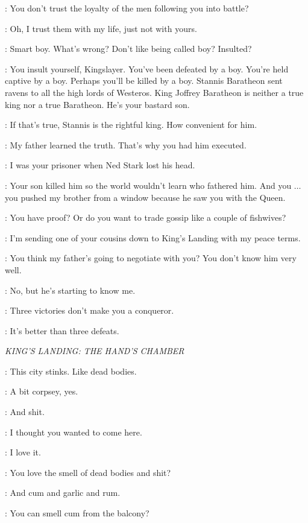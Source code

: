\JAIME: You don't trust the loyalty of the men following you into battle?

\ROBB: Oh, I trust them with my life, just not with yours.

\JAIME: Smart boy. What's wrong? Don't like being called boy? Insulted?

\ROBB: You insult yourself, Kingslayer. You've been defeated by a boy. You're held captive by a boy. Perhaps you'll be killed by a boy. Stannis Baratheon sent ravens to all the high lords of Westeros. King Joffrey Baratheon is neither a true king nor a true Baratheon. He's your bastard son.

\JAIME: If that's true, Stannis is the rightful king. How convenient for him.

\ROBB: My father learned the truth. That's why you had him executed.

\JAIME: I was your prisoner when Ned Stark lost his head.

\ROBB: Your son killed him so the world wouldn't learn who fathered him. And you $\ldots$ you pushed my brother from a window because he saw you with the Queen.

\JAIME: You have proof? Or do you want to trade gossip like a couple of fishwives?

\ROBB: I'm sending one of your cousins down to King's Landing with my peace terms.

\JAIME: You think my father's going to negotiate with you? You don't know him very well.

\ROBB: No, but he's starting to know me.

\JAIME: Three victories don't make you a conqueror.

\ROBB: It's better than three defeats.


\scene

\textit{KING'S LANDING: THE HAND'S CHAMBER}


\SHAE: This city stinks. Like dead bodies.

\TYRION: A bit corpsey, yes.

\SHAE: And shit.

\TYRION: I thought you wanted to come here.

\SHAE: I love it.

\TYRION: You love the smell of dead bodies and shit?

\SHAE: And cum and garlic and rum.

\TYRION: You can smell cum from the balcony?

